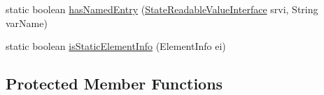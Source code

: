 \begin{DoxyCompactItemize}
\item 
static boolean \hyperlink{classgov_1_1nasa_1_1jpf_1_1inspector_1_1server_1_1programstate_1_1_state_value_acf7b963024cd7f1cd5c23975621f83c7}{has\+Named\+Entry} (\hyperlink{interfacegov_1_1nasa_1_1jpf_1_1inspector_1_1server_1_1programstate_1_1_state_readable_value_interface}{State\+Readable\+Value\+Interface} srvi, String var\+Name)
\item 
static boolean \hyperlink{classgov_1_1nasa_1_1jpf_1_1inspector_1_1server_1_1programstate_1_1_state_value_a25dfd1e417420303104033dd3342c659}{is\+Static\+Element\+Info} (Element\+Info ei)
\end{DoxyCompactItemize}
\subsection*{Protected Member Functions}

